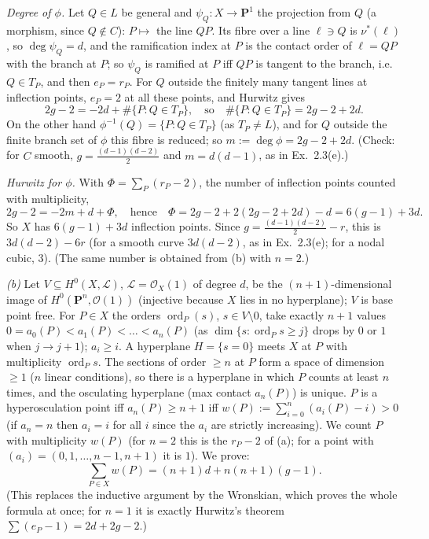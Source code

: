 \documentclass[11pt]{article}
\begin{document}
\emph{Degree of $\phi$.} Let $Q\in L$ be general and $\psi_Q:X\to\mathbf P^1$ the projection from $Q$ (a morphism, since $Q\notin C$): $P\mapsto$ the line $QP$. Its fibre over a line $\ell\ni Q$ is $\nu^*(\ell)$, so $\deg\psi_Q=d$, and the ramification index at $P$ is the contact order of $\ell=QP$ with the branch at $P$; so $\psi_Q$ is ramified at $P$ iff $QP$ is tangent to the branch, i.e.\ $Q\in T_P$, and then $e_P=r_P$. For $Q$ outside the finitely many tangent lines at inflection points, $e_P=2$ at all these points, and Hurwitz gives
\[ 2g-2=-2d+\#\{P:Q\in T_P\},\quad\text{so}\quad \#\{P:Q\in T_P\}=2g-2+2d. \]
On the other hand $\phi^{-1}(Q)=\{P:Q\in T_P\}$ (as $T_P\ne L$), and for $Q$ outside the finite branch set of $\phi$ this fibre is reduced; so $m:=\deg\phi=2g-2+2d$. (Check: for $C$ smooth, $g=\frac{(d-1)(d-2)}2$ and $m=d(d-1)$, as in Ex.~2.3(e).)

\emph{Hurwitz for $\phi$.} With $\Phi=\sum_P(r_P-2)$, the number of inflection points counted with multiplicity,
\[ 2g-2=-2m+d+\Phi,\quad\text{hence}\quad \Phi=2g-2+2(2g-2+2d)-d=6(g-1)+3d. \]
So $X$ has $6(g-1)+3d$ inflection points. Since $g=\frac{(d-1)(d-2)}2-r$, this is $3d(d-2)-6r$ (for a smooth curve $3d(d-2)$, as in Ex.~2.3(e); for a nodal cubic, $3$). \hfill (The same number is obtained from (b) with $n=2$.)

\emph{(b)} Let $V\subseteq H^0(X,\mathcal L)$, $\mathcal L=\mathcal O_X(1)$ of degree $d$, be the $(n+1)$-dimensional image of $H^0(\mathbf P^n,\mathcal O(1))$ (injective because $X$ lies in no hyperplane); $V$ is base point free. For $P\in X$ the orders $\operatorname{ord}_P(s)$, $s\in V\setminus0$, take exactly $n+1$ values $0=a_0(P)<a_1(P)<\dots<a_n(P)$ (as $\dim\{s:\operatorname{ord}_Ps\ge j\}$ drops by $0$ or $1$ when $j\to j+1$); $a_i\ge i$. A hyperplane $H=\{s=0\}$ meets $X$ at $P$ with multiplicity $\operatorname{ord}_Ps$. The sections of order $\ge n$ at $P$ form a space of dimension $\ge1$ ($n$ linear conditions), so there is a hyperplane in which $P$ counts at least $n$ times, and the osculating hyperplane (max contact $a_n(P)$) is unique. $P$ is a hyperosculation point iff $a_n(P)\ge n+1$ iff $w(P):=\sum_{i=0}^n(a_i(P)-i)>0$ (if $a_n=n$ then $a_i=i$ for all $i$ since the $a_i$ are strictly increasing). We count $P$ with multiplicity $w(P)$ (for $n=2$ this is the $r_P-2$ of (a); for a point with $(a_i)=(0,1,\dots,n-1,n+1)$ it is $1$). We prove:
\[ \sum_{P\in X}w(P)=(n+1)d+n(n+1)(g-1). \]
(This replaces the inductive argument by the Wronskian, which proves the whole formula at once; for $n=1$ it is exactly Hurwitz's theorem $\sum(e_P-1)=2d+2g-2$.)
\end{document}

